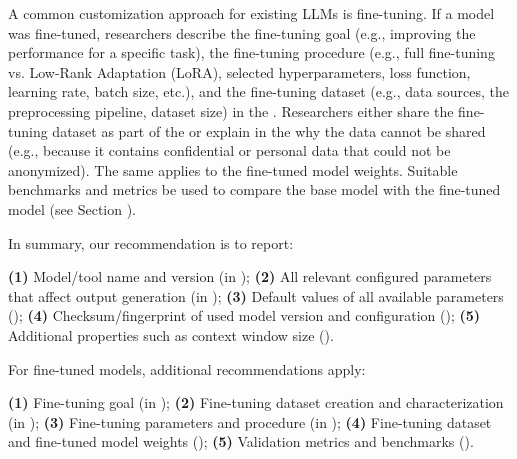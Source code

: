 A common customization approach for existing LLMs is fine-tuning.
If a model was fine-tuned, researchers \must describe the fine-tuning goal (e.g., improving the performance for a specific task), the fine-tuning procedure (e.g., full fine-tuning vs. Low-Rank Adaptation (LoRA), selected hyperparameters, loss function, learning rate, batch size, etc.), and the fine-tuning dataset (e.g., data sources, the preprocessing pipeline, dataset size) in the \paper.
Researchers \should either share the fine-tuning dataset as part of the \supplementarymaterial or explain in the \paper why the data cannot be shared (e.g., because it contains confidential or personal data that could not be anonymized).
The same applies to the fine-tuned model weights.
Suitable benchmarks and metrics \should be used to compare the base model with the fine-tuned model (see Section \benchmarksmetrics).

In summary, our recommendation is to report:

\textbf{(1)} Model/tool name and version (\must in \paper);
\textbf{(2)} All relevant configured parameters that affect output generation (\must in \paper);
\textbf{(3)} Default values of all available parameters (\should);
\textbf{(4)} Checksum/fingerprint of used model version and configuration (\may);
\textbf{(5)} Additional properties such as context window size (\may).

For fine-tuned models, additional recommendations apply:

\textbf{(1)} Fine-tuning goal (\must in \paper);
\textbf{(2)} Fine-tuning dataset creation and characterization (\must in \paper);
\textbf{(3)} Fine-tuning parameters and procedure (\must in \paper);
\textbf{(4)} Fine-tuning dataset and fine-tuned model weights (\should);
\textbf{(5)} Validation metrics and benchmarks (\should).

